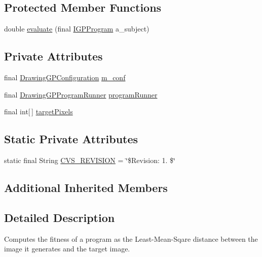 \subsection*{Protected Member Functions}
\begin{DoxyCompactItemize}
\item 
double \hyperlink{classexamples_1_1gp_1_1monalisa_1_1core_1_1_l_m_s_fitness_function_a0b4c30ca58a2c59b20c5120485b4de08}{evaluate} (final \hyperlink{interfaceorg_1_1jgap_1_1gp_1_1_i_g_p_program}{I\-G\-P\-Program} a\-\_\-subject)
\end{DoxyCompactItemize}
\subsection*{Private Attributes}
\begin{DoxyCompactItemize}
\item 
final \hyperlink{classexamples_1_1gp_1_1monalisa_1_1core_1_1_drawing_g_p_configuration}{Drawing\-G\-P\-Configuration} \hyperlink{classexamples_1_1gp_1_1monalisa_1_1core_1_1_l_m_s_fitness_function_a617f85f4c1c2c21e30ff2d2e06660d86}{m\-\_\-conf}
\item 
final \hyperlink{classexamples_1_1gp_1_1monalisa_1_1core_1_1_drawing_g_p_program_runner}{Drawing\-G\-P\-Program\-Runner} \hyperlink{classexamples_1_1gp_1_1monalisa_1_1core_1_1_l_m_s_fitness_function_af834bb4fcc8e4e34fad814f78c8ed1f5}{program\-Runner}
\item 
final int\mbox{[}$\,$\mbox{]} \hyperlink{classexamples_1_1gp_1_1monalisa_1_1core_1_1_l_m_s_fitness_function_aee3988243075e939f5693547a0d012e9}{target\-Pixels}
\end{DoxyCompactItemize}
\subsection*{Static Private Attributes}
\begin{DoxyCompactItemize}
\item 
static final String \hyperlink{classexamples_1_1gp_1_1monalisa_1_1core_1_1_l_m_s_fitness_function_ab167499a183c7c5c4ce987dcee96296c}{C\-V\-S\-\_\-\-R\-E\-V\-I\-S\-I\-O\-N} = \char`\"{}\$Revision\-: 1. \$\char`\"{}
\end{DoxyCompactItemize}
\subsection*{Additional Inherited Members}


\subsection{Detailed Description}
Computes the fitness of a program as the Least-\/\-Mean-\/\-Sqare distance between the image it generates and the target image.

